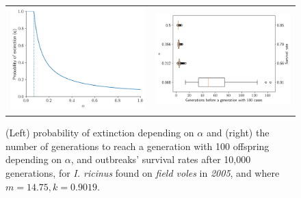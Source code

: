 \documentclass[hidelinks]{article}
\begin{document}
\begin{figure}[]
	\begin{mdframed}[backgroundcolor=grey250,rightline=false,leftline=false,topline=false]
		\centering
		\begin{tabular}{ll}
			\includegraphics[width=.46\linewidth,valign=m]{extinctionProbability2005_I. ricinus_FV} & \includegraphics[width=.50\linewidth,valign=m]{firstGeneration100_2005_I. ricinus_FV}
		\end{tabular}
		\caption{(Left) probability of extinction depending on $ \alpha $ and (right) the number of generations to reach a generation with 100 offspring depending on $ \alpha $, and  outbreaks' survival rates after 10,000 generations, for \textit{I. ricinus} found on \textit{field voles} in \textit{2005}, and where $ m = 14.75, k = 0.9019 $.}
		\label{fig:simulation_2005_iricinus_FV}
	\end{mdframed}
\end{figure}
\end{document}
